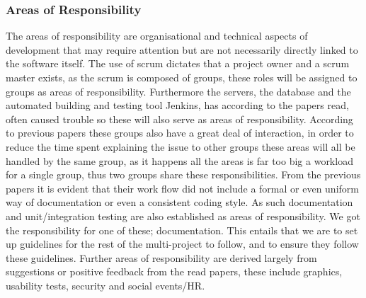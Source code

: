 \subsubsection*{Areas of Responsibility}
The areas of responsibility are organisational and technical aspects of development that may require attention but are not necessarily directly linked to the software itself.
The use of scrum dictates that a project owner and a scrum master exists, as the scrum is composed of groups, these roles will be assigned to groups as areas of responsibility.
Furthermore the servers, the database and the automated building and testing tool Jenkins, has according to the papers read, often caused trouble so these will also serve as areas of responsibility. 
According to previous papers these groups also have a great deal of interaction, in order to reduce the time spent explaining the issue to other groups these areas will all be handled by the same group, as it happens all the areas is far too big a workload for a single group, thus two groups share these responsibilities.
From the previous papers it is evident that their work flow did not include a formal or even uniform way of documentation or even a consistent coding style.
As such documentation and unit/integration testing are also established as areas of responsibility.
We got the responsibility for one of these; documentation. 
This entails that we are to set up guidelines for the rest of the multi-project to follow, and to ensure they follow these guidelines.
Further areas of responsibility are derived largely from suggestions or positive feedback from the read papers, these include graphics, usability tests, security and social events/HR.

